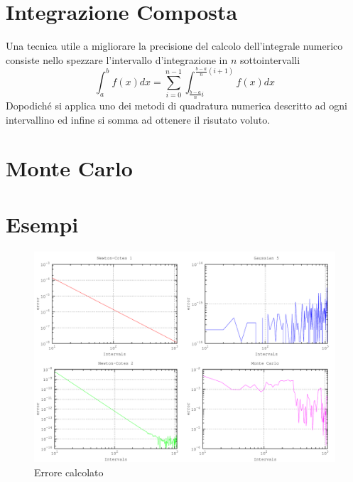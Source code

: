 \section{Integrazione Composta}
Una tecnica utile a migliorare la precisione del calcolo dell'integrale numerico consiste nello spezzare l'intervallo d'integrazione in $n$ sottointervalli
$$\int_a^b f(x)dx=\sum_{i=0}^{n-1}\int_{\frac{b-a}{n}i}^{\frac{b-a}{n}(i+1)}f(x)dx$$
Dopodiché si applica uno dei metodi di quadratura numerica descritto ad ogni intervallino ed infine si somma ad ottenere il risutato voluto.

\section{Monte Carlo}

\section{Esempi}
\begin{figure}[h]
\centering
\includegraphics[width=\textwidth]{integral}
\caption{Errore calcolato}
\label{fig:integral}
\end{figure}

